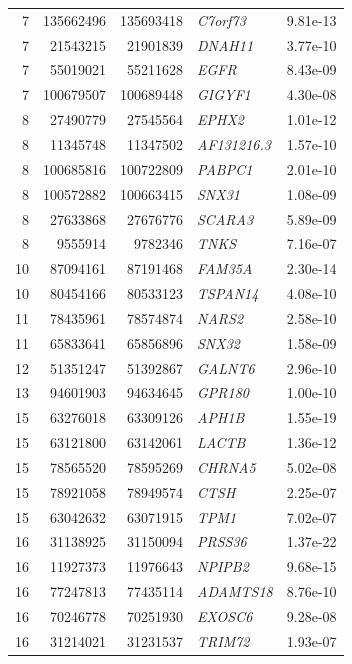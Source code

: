 \begin{longtable}{rrrlr}
    7 & 135662496 & 135693418 & \textit{C7orf73} & 9.81e-13 \\ 
    7 & 21543215 & 21901839 & \textit{DNAH11} & 3.77e-10 \\ 
    7 & 55019021 & 55211628 & \textit{EGFR} & 8.43e-09 \\ 
    7 & 100679507 & 100689448 & \textit{GIGYF1} & 4.30e-08 \\ 
    8 & 27490779 & 27545564 & \textit{EPHX2} & 1.01e-12 \\ 
    8 & 11345748 & 11347502 & \textit{AF131216.3} & 1.57e-10 \\ 
    8 & 100685816 & 100722809 & \textit{PABPC1} & 2.01e-10 \\ 
    8 & 100572882 & 100663415 & \textit{SNX31} & 1.08e-09 \\ 
    8 & 27633868 & 27676776 & \textit{SCARA3} & 5.89e-09 \\ 
    8 & 9555914 & 9782346 & \textit{TNKS} & 7.16e-07 \\ 
   10 & 87094161 & 87191468 & \textit{FAM35A} & 2.30e-14 \\ 
   10 & 80454166 & 80533123 & \textit{TSPAN14} & 4.08e-10 \\ 
   11 & 78435961 & 78574874 & \textit{NARS2} & 2.58e-10 \\ 
   11 & 65833641 & 65856896 & \textit{SNX32} & 1.58e-09 \\ 
   12 & 51351247 & 51392867 & \textit{GALNT6} & 2.96e-10 \\ 
   13 & 94601903 & 94634645 & \textit{GPR180} & 1.00e-10 \\ 
   15 & 63276018 & 63309126 & \textit{APH1B} & 1.55e-19 \\ 
   15 & 63121800 & 63142061 & \textit{LACTB} & 1.36e-12 \\ 
   15 & 78565520 & 78595269 & \textit{CHRNA5} & 5.02e-08 \\ 
   15 & 78921058 & 78949574 & \textit{CTSH} & 2.25e-07 \\ 
   15 & 63042632 & 63071915 & \textit{TPM1} & 7.02e-07 \\ 
   16 & 31138925 & 31150094 & \textit{PRSS36} & 1.37e-22 \\ 
   16 & 11927373 & 11976643 & \textit{NPIPB2} & 9.68e-15 \\ 
   16 & 77247813 & 77435114 & \textit{ADAMTS18} & 8.76e-10 \\ 
   16 & 70246778 & 70251930 & \textit{EXOSC6} & 9.28e-08 \\ 
   16 & 31214021 & 31231537 & \textit{TRIM72} & 1.93e-07 \\ 

\end{longtable}
